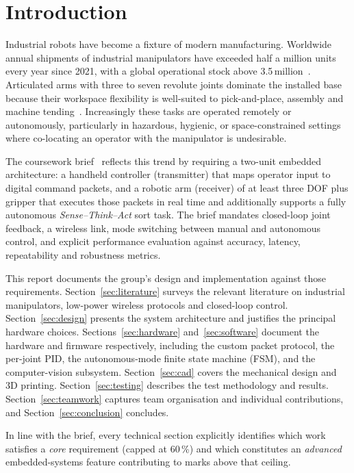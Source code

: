 \section{Introduction}
\label{sec:introduction}

Industrial robots have become a fixture of modern manufacturing.
Worldwide annual shipments of industrial manipulators have exceeded
half a million units every year since 2021, with a global operational
stock above 3.5\,million~\cite{ifr2024}. Articulated arms with three
to seven revolute joints dominate the installed base because their
workspace flexibility is well-suited to pick-and-place, assembly and
machine tending~\cite{siciliano2009}. Increasingly these tasks are
operated remotely or autonomously, particularly in hazardous,
hygienic, or space-constrained settings where co-locating an operator
with the manipulator is undesirable.

The coursework brief~\cite{ee6003brief} reflects this trend by
requiring a two-unit embedded architecture: a handheld controller
(transmitter) that maps operator input to digital command packets, and
a robotic arm (receiver) of at least three DOF plus gripper that
executes those packets in real time and additionally supports a
fully autonomous \emph{Sense--Think--Act} sort task. The brief
mandates closed-loop joint feedback, a wireless link, mode switching
between manual and autonomous control, and explicit
performance evaluation against accuracy, latency, repeatability and
robustness metrics.

This report documents the group's design and implementation against
those requirements. Section~\ref{sec:literature} surveys the relevant
literature on industrial manipulators, low-power wireless protocols
and closed-loop control. Section~\ref{sec:design} presents the system
architecture and justifies the principal hardware choices.
Sections~\ref{sec:hardware} and~\ref{sec:software} document the
hardware and firmware respectively, including the custom packet
protocol, the per-joint PID, the autonomous-mode finite state machine
(FSM), and the computer-vision subsystem. Section~\ref{sec:cad}
covers the mechanical design and 3D printing.
Section~\ref{sec:testing} describes the test methodology and
results. Section~\ref{sec:teamwork} captures team organisation and
individual contributions, and Section~\ref{sec:conclusion} concludes.

In line with the brief, every technical section explicitly identifies
which work satisfies a \emph{core} requirement (capped at 60\,\%) and
which constitutes an \emph{advanced} embedded-systems feature
contributing to marks above that ceiling.
